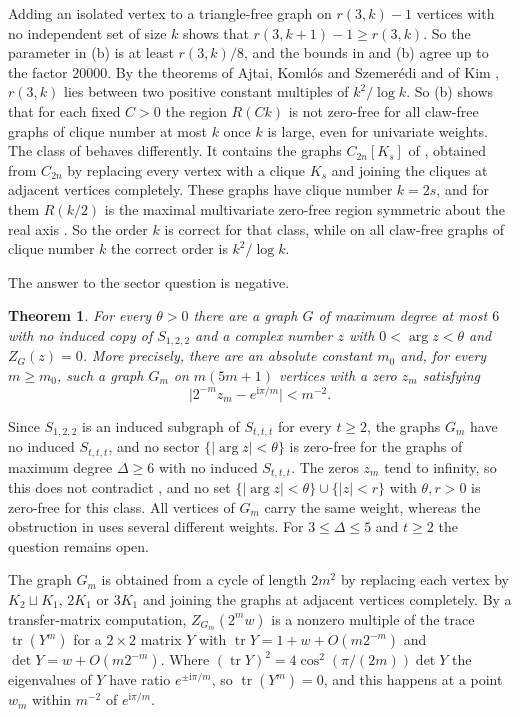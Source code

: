 \documentclass[11pt]{article}
\newtheorem{theorem}{Theorem}[section]
\theoremstyle{remark}
\newcommand{\tr}{\operatorname{tr}}
\begin{document}
Adding an isolated vertex to a triangle-free graph on $r(3,k)-1$ vertices with no independent set of size $k$ shows
that $r(3,k+1)-1\ge r(3,k)$. So the parameter in (b) is at least $r(3,k)/8$, and the bounds in
 and (b) agree up to the factor $20000$. By the theorems of Ajtai, Koml\'os and Szemer\'edi \cite{AKS} and of Kim \cite{Kim}, $r(3,k)$ lies
between two positive constant multiples of $k^2/\log k$. So (b) shows that for each fixed $C>0$ the
region $R(Ck)$ is not zero-free for all claw-free graphs of clique number at most $k$ once $k$ is large, even for
univariate weights. The class of \cite[Theorem~6]{JP} behaves differently. It contains the graphs $C_{2n}[K_s]$ of
\cite[Section~5.2]{JP}, obtained from $C_{2n}$ by replacing every vertex with a clique $K_s$ and joining the cliques
at adjacent vertices completely. These graphs have clique number $k=2s$, and for them $R(k/2)$ is the maximal multivariate zero-free region
symmetric about the real axis \cite[Lemma~14]{JP}. So the order $k$ is correct for that class, while on all claw-free
graphs of clique number $k$ the correct order is $k^2/\log k$.

The answer to the sector question is negative.

\begin{theorem}\label{thm:sector}
For every $\theta>0$ there are a graph $G$ of maximum degree at most $6$ with no induced copy of $S_{1,2,2}$ and a
complex number $z$ with $0<\arg z<\theta$ and $Z_G(z)=0$. More precisely, there are an absolute constant $m_0$ and,
for every $m\ge m_0$, such a graph $G_m$ on $m(5m+1)$ vertices with a zero $z_m$ satisfying
\[
\bigl|2^{-m}z_m-e^{\mathrm i\pi/m}\bigr|<m^{-2}.
\]
\end{theorem}

Since $S_{1,2,2}$ is an induced subgraph of $S_{t,t,t}$ for every $t\ge2$, the graphs $G_m$ have no induced
$S_{t,t,t}$, and no sector $\{|\arg z|<\theta\}$ is zero-free for the graphs of maximum degree $\Delta\ge6$ with no
induced $S_{t,t,t}$. The zeros $z_m$ tend to infinity, so this does not contradict \cite[Theorem~3]{JP}, and no set
$\{|\arg z|<\theta\}\cup\{|z|<r\}$ with $\theta,r>0$ is zero-free for this class. All vertices of $G_m$ carry the same weight, whereas the obstruction in
\cite[Lemma~15]{JP} uses several different weights. For $3\le\Delta\le5$ and $t\ge2$ the question remains open.

The graph $G_m$ is obtained from a cycle of length $2m^2$ by replacing each vertex by $K_2\sqcup K_1$, $2K_1$ or
$3K_1$ and joining the graphs at adjacent vertices completely. By a
transfer-matrix computation, $Z_{G_m}(2^mw)$ is a nonzero multiple of the trace $\tr(Y^m)$ for a $2\times2$ matrix $Y$ with
$\tr Y=1+w+O(m2^{-m})$ and $\det Y=w+O(m2^{-m})$. Where $(\tr Y)^2=4\cos^2(\pi/(2m))\det Y$ the eigenvalues of $Y$
have ratio $e^{\pm\mathrm i\pi/m}$, so $\tr(Y^m)=0$, and this happens at a point $w_m$ within $m^{-2}$ of
$e^{\mathrm i\pi/m}$.
\end{document}

